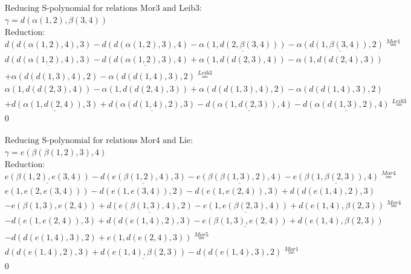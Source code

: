 \documentclass[11pt]{amsart}
\begin{document}
\begin{align*} 
& \text{Reducing S-polynomial for relations Mor3 and Leib3:} \\ 
& \gamma = d(\alpha(1,2),\beta(3,4)) \\ 
& \text{Reduction}: \\&d(d(\alpha(1,2),4),3) - d(d(\alpha(1,2),3),4) - \underline{\alpha(1,d(2,\beta(3,4)))} - \underline{\alpha(d(1,\beta(3,4)),2)} \stackrel{ Mor1 }{=}  \\ 
&\underline{d(d(\alpha(1,2),4),3)} - \underline{d(d(\alpha(1,2),3),4)} + \alpha(1,d(d(2,3),4)) - \alpha(1,d(d(2,4),3))\\ 
 &  + \alpha(d(d(1,3),4),2) - \alpha(d(d(1,4),3),2) \stackrel{ Leib3 }{=}  \\ 
&\alpha(1,d(d(2,3),4)) - \alpha(1,d(d(2,4),3)) + \alpha(d(d(1,3),4),2) - \alpha(d(d(1,4),3),2)\\ 
 &  + \underline{d(\alpha(1,d(2,4)),3)} + \underline{d(\alpha(d(1,4),2),3)} - \underline{d(\alpha(1,d(2,3)),4)} - \underline{d(\alpha(d(1,3),2),4)} \stackrel{ Leib3 }{=}  \\ 
&0\\ 
\end{align*} 
 
\begin{align*} 
& \text{Reducing S-polynomial for relations Mor4 and Lie:} \\ 
& \gamma = e(\beta(\beta(1,2),3),4) \\ 
& \text{Reduction}: \\&\underline{e(\beta(1,2),e(3,4))} - \underline{d(e(\beta(1,2),4),3)} - \underline{e(\beta(\beta(1,3),2),4)} - \underline{e(\beta(1,\beta(2,3)),4)} \stackrel{ Mor4 }{=}  \\ 
&e(1,e(2,e(3,4))) - d(e(1,e(3,4)),2) - d(e(1,e(2,4)),3) + d(d(e(1,4),2),3)\\ 
 &  - e(\beta(1,3),e(2,4)) + \underline{d(e(\beta(1,3),4),2)} - \underline{e(1,e(\beta(2,3),4))} + d(e(1,4),\beta(2,3)) \stackrel{ Mor4 }{=}  \\ 
& - d(e(1,e(2,4)),3) + d(d(e(1,4),2),3) - \underline{e(\beta(1,3),e(2,4))} + d(e(1,4),\beta(2,3))\\ 
 &  - d(d(e(1,4),3),2) + e(1,d(e(2,4),3)) \stackrel{ Mor5 }{=}  \\ 
&d(d(e(1,4),2),3) + \underline{d(e(1,4),\beta(2,3))} - d(d(e(1,4),3),2) \stackrel{ Mor1 }{=}  \\ 
&0\\ 
\end{align*} 
 
\end{document}
